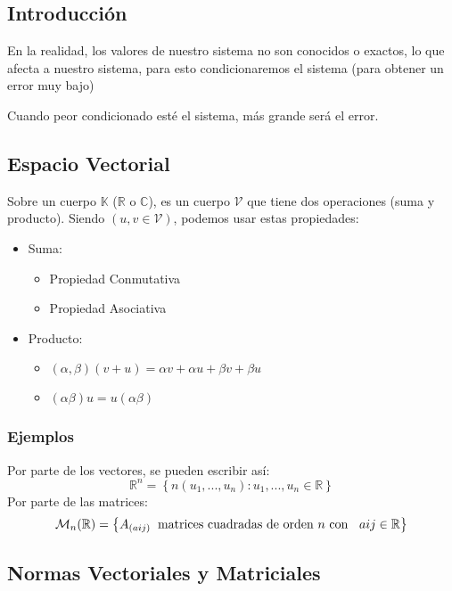 \subsection{Introducción}
En la realidad, los valores de nuestro sistema no son conocidos o exactos, lo que afecta a nuestro sistema, para esto condicionaremos el sistema (para obtener un error muy bajo)
\par Cuando peor condicionado esté el sistema, más grande será el error.
\subsection{Espacio Vectorial}
Sobre un cuerpo \(\mathbb{K}\) (\(\mathbb{R} \) o \(\mathbb{C} \)), es un cuerpo \(\mathcal{V}\) que tiene dos operaciones (suma y producto). Siendo \((u,v \in \mathcal{V})\), podemos usar estas propiedades:
\begin{itemize}
        \item Suma:
              \begin{itemize}
                      \item Propiedad Conmutativa
                      \item Propiedad Asociativa
              \end{itemize}
        \item Producto:
              \begin{itemize}
                      \item \((\alpha, \beta)(v+u) = \alpha v + \alpha u + \beta v + \beta u\)
                      \item  \((\alpha\beta)u = u(\alpha\beta)\)
              \end{itemize}
\end{itemize}
\subsubsection{Ejemplos}
Por parte de los vectores, se pueden escribir así:
\[
        \mathbb{R}^n = \left \{ n\left ( u_1,..., u_n \right ) : u_1,...,u_n \in \mathbb{R} \right \}
\]
Por parte de las matrices:
\[
        \mathcal{M}_n(\mathbb{R}) = \left \{ A_{\left ( aij \right )} \text{\hspace{2mm}matrices cuadradas de orden \(n\) con \hspace{2mm}} aij \in \mathbb{R} \right \}
\]
\subsection{Normas Vectoriales y Matriciales}
